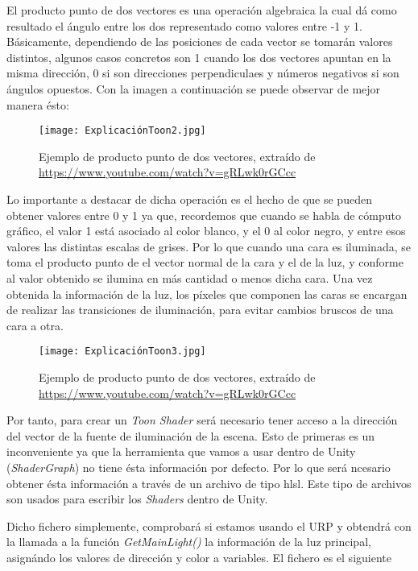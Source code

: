 El producto punto de dos vectores es una operación algebraica la cual dá como resultado el ángulo entre los dos representado como valores entre -1 y 1. Básicamente, dependiendo de las posiciones de cada vector se tomarán valores distintos, algunos casos concretos son 1 cuando los dos vectores apuntan en la misma dirección, 0 si son direcciones perpendiculaes y números negativos si son ángulos opuestos. Con la imagen a continuación se puede observar de mejor manera ésto: 

\begin{figure}[H]
    \centering
    \texttt{[image: ExplicaciónToon2.jpg]}
    \caption{Ejemplo de producto punto de dos vectores, extraído de \url{https://www.youtube.com/watch?v=gRLwk0rGCcc}}
\end{figure}

Lo importante a destacar de dicha operación es el hecho de que se pueden obtener valores entre 0 y 1 ya que, recordemos que cuando se habla de cómputo gráfico, el valor 1 está asociado al color blanco, y el 0 al color negro, y entre esos valores las distintas escalas de grises. Por lo que cuando una cara es iluminada, se toma el producto punto de el vector normal de la cara y el de la luz, y conforme al valor obtenido se ilumina en más cantidad o menos dicha cara. Una vez obtenida la información de la luz, los píxeles que componen las caras se encargan de realizar las transiciones de iluminación, para evitar cambios bruscos de una cara a otra.

\begin{figure}[H]
    \centering
    \texttt{[image: ExplicaciónToon3.jpg]}
    \caption{Ejemplo de producto punto de dos vectores, extraído de \url{https://www.youtube.com/watch?v=gRLwk0rGCcc}}
\end{figure}

Por tanto, para crear un \textit{Toon Shader} será necesario tener acceso a la dirección del vector de la fuente de iluminación de la escena. Esto de primeras es un inconveniente ya que la herramienta que vamos a usar dentro de Unity (\textit{ShaderGraph}) no tiene ésta información por defecto. Por lo que será ncesario obtener ésta información a través de un archivo de tipo hlsl. Este tipo de archivos son usados para escribir los \textit{Shaders} dentro de Unity.

Dicho fichero simplemente, comprobará si estamos usando el URP y obtendrá con la llamada a la función \textit{GetMainLight()} la información de la luz principal, asignándo los valores de dirección y color a variables. El fichero es el siguiente

